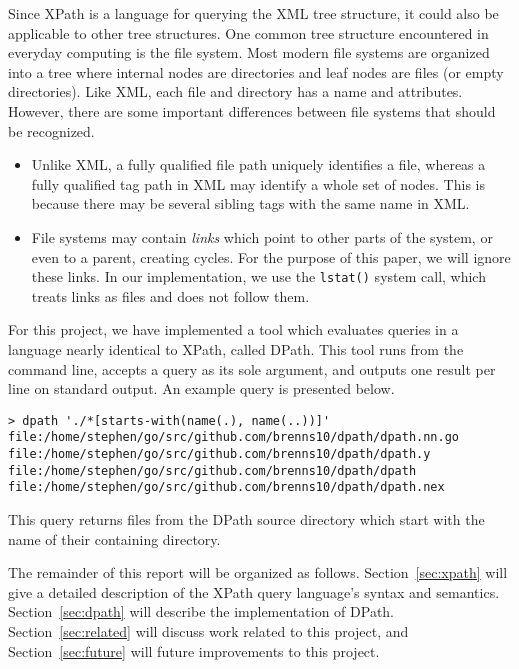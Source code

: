 \documentclass{article}
\begin{document}
Since XPath is a language for querying the XML tree structure, it could also be
applicable to other tree structures. One common tree structure encountered in
everyday computing is the file system. Most modern file systems are organized
into a tree where internal nodes are directories and leaf nodes are files (or
empty directories). Like XML, each file and directory has a name and attributes.
However, there are some important differences between file systems that should
be recognized.

\begin{itemize}
\item Unlike XML, a fully qualified file path uniquely identifies a file,
  whereas a fully qualified tag path in XML may identify a whole set of nodes.
  This is because there may be several sibling tags with the same name in XML.
\item File systems may contain \emph{links} which point to other parts of the
  system, or even to a parent, creating cycles. For the purpose of this paper,
  we will ignore these links. In our implementation, we use the \texttt{lstat()}
  system call, which treats links as files and does not follow them.
\end{itemize}

For this project, we have implemented a tool which evaluates queries in a
language nearly identical to XPath, called DPath. This tool runs from the
command line, accepts a query as its sole argument, and outputs one result per
line on standard output. An example query is presented below.

\begin{lstlisting}
> dpath './*[starts-with(name(.), name(..))]'
file:/home/stephen/go/src/github.com/brenns10/dpath/dpath.nn.go
file:/home/stephen/go/src/github.com/brenns10/dpath/dpath.y
file:/home/stephen/go/src/github.com/brenns10/dpath/dpath
file:/home/stephen/go/src/github.com/brenns10/dpath/dpath.nex
\end{lstlisting}

This query returns files from the DPath source directory which start with the
name of their containing directory.

The remainder of this report will be organized as follows.
Section~\ref{sec:xpath} will give a detailed description of the XPath query
language's syntax and semantics. Section~\ref{sec:dpath} will describe the
implementation of DPath. Section~\ref{sec:related} will discuss work related to
this project, and Section~\ref{sec:future} will future improvements to this
project.
\end{document}

